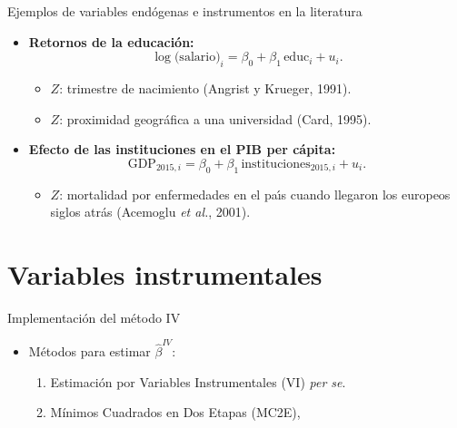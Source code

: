 \documentclass[10pt]{beamer}
\begin{document}
\begin{frame}{Ejemplos de variables end\'ogenas e instrumentos en la literatura}
    \begin{itemize}
        \item \textbf{Retornos de la educaci\'on:}
        $$
        \log \bigl(\text{salario}\bigr)_{i}=\beta_{0}+\beta_{1} \,\text{educ}_{i}+u_{i}.
        $$
        \begin{itemize}
            \item $Z$: trimestre de nacimiento (Angrist y Krueger, 1991).
            \item $Z$: proximidad geogr\'afica a una universidad (Card, 1995).
        \end{itemize}

        \item \textbf{Efecto de las instituciones en el PIB per c\'apita:}
        $$
        \text{GDP}_{2015,i}=\beta_{0}+\beta_{1}\, \text{instituciones}_{2015,i}+u_{i}.
        $$
        \begin{itemize}
            \item $Z$: mortalidad por enfermedades en el pa\'\i s cuando llegaron los europeos siglos atr\'as (Acemoglu \emph{et al.}, 2001).
        \end{itemize}
    \end{itemize}
\end{frame}

\section{Variables instrumentales}

\begin{frame}{Implementaci\'on del m\'etodo IV}
    \begin{itemize}
        \item M\'etodos para estimar $\hat{\beta}^{IV}$:
        \begin{enumerate}
            \item Estimaci\'on por Variables Instrumentales (VI) \textit{per se}.
            \item M\'inimos Cuadrados en Dos Etapas (MC2E), 
        \end{enumerate}
    \end{itemize}
\end{frame}
\end{document}
